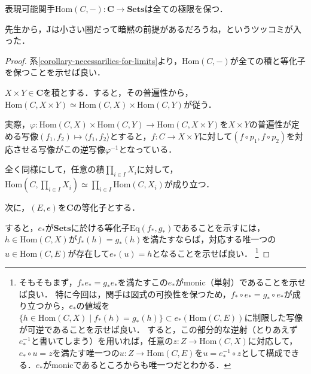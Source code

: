 \documentclass[uplatex, 12pt, dvipdfmx]{jsarticle}
\begin{document}
\begin{proposition}
    表現可能関手$\mathrm{Hom}(C,-):\mathbf{C}\to\mathbf{Sets}$は全ての極限を保つ．
\end{proposition}
\begin{remark*}
    先生から，$\mathbf{J}$は小さい圏だって暗黙の前提があるだろうね，というツッコミが入った．
\end{remark*}
\begin{proof}
    系\ref{corollary-necessarilies-for-limits}より，$\mathrm{Hom}(C,-)$が全ての積と等化子を保つことを示せば良い．

    $X\times Y\in\mathbf{C}$を積とする．すると，その普遍性から，$\mathrm{Hom}(C,X\times Y)\simeq \mathrm{Hom}(C,X)\times\mathrm{Hom}(C,Y)$が従う．
    \begin{center}
    \end{center}
    実際，$\varphi:\mathrm{Hom}(C,X)\times\mathrm{Hom}(C,Y)\to\mathrm{Hom}(C,X\times Y)$を$X\times Y$の普遍性が定める写像$(f_1,f_2)\mapsto\langle f_1,f_2\rangle$とすると，$f:C\to X\times Y$に対して$(f\circ p_1,f\circ p_2)$を対応させる写像がこの逆写像$\varphi^{-1}$となっている．

    全く同様にして，任意の積$\prod_{i\in I}X_i$に対して，$\mathrm{Hom}(C,\prod_{i\in I}X_i)\simeq\prod_{i\in I}\mathrm{Hom}(C,X_i)$が成り立つ．

    次に，$(E,e)$を$\mathbf{C}$の等化子とする．
    \begin{center}
    \end{center}
    すると，$e_*$が$\mathbf{Sets}$に於ける等化子$\mathrm{Eq}(f_*,g_*)$であることを示すには，$h\in\mathrm{Hom}(C,X)$が$f_*(h)=g_*(h)$を満たすならば，対応する唯一つの$u\in\mathrm{Hom}(C,E)$が存在して$e_*(u)=h$となることを示せば良い．
    \footnote{そもそもまず，$f_*e_*=g_*e_*$を満たすこの$e_*$がmonic（単射）であることを示せば良い．
    特に今回は，関手は図式の可換性を保つため，$f_*\circ e_*=g_*\circ e_*$が成り立つから，$e_*$の値域を$\{ h\in\mathrm{Hom}(C,X)\mid f_*(h)=g_*(h) \}\subset e_*(\mathrm{Hom}(C,E))$に制限した写像が可逆であることを示せば良い．
    すると，この部分的な逆射（とりあえず$e_*^{-1}$と書いてしまう）を用いれば，任意の$z:Z\to\mathrm{Hom}(C,X)$に対応して，$e_*\circ u=z$を満たす唯一つの$u:Z\to\mathrm{Hom}(C,E)$を$u=e_*^{-1}\circ z$として構成できる．$e_*$がmonicであるところからも唯一つだとわかる．}


\end{proof}
\end{document}
